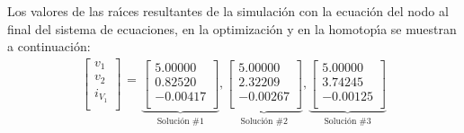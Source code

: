 \documentclass[conference,letterpaper,onecolumn]{IEEEtran}
\begin{document}
Los valores de  las ra\'{\i}ces resultantes de la simulaci\'on con la
ecuaci\'on del nodo  al final del sistema de ecuaciones, en la
optimizaci\'on y en la homotop\'{\i}a se muestran a continuaci\'on:
\begin{displaymath}
\begin{array}{r}
\left[\begin{array}{r} v_1 \\ v_2  \\ i_{V_1}  \\ \end{array}\right]
\begin{array}{r}
 \\ = \\ \\
\end{array}
\underbrace{\left[\begin{array}{r}
5.00000 \\
0.82520  \\
-0.00417 \\
\end{array}\right]}_{\mbox{Soluci\'on \#1}},
\underbrace{\left[\begin{array}{r}
5.00000 \\
2.32209 \\
-0.00267 \\
\end{array}\right]}_{\mbox{Soluci\'on \#2}}, 
\underbrace{\left[\begin{array}{r}
 5.00000\\
 3.74245 \\
 -0.00125 \\
\end{array}\right]}_{\mbox{Soluci\'on \#3}}
\end{array}
\end{displaymath}
\end{document}
